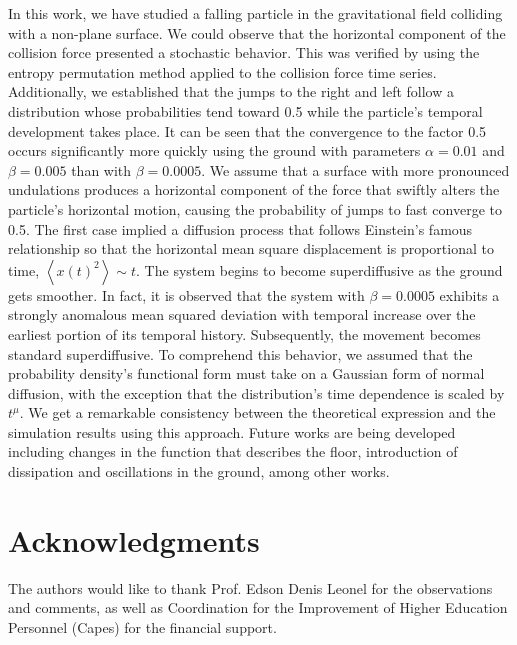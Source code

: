 \documentclass[reprint, aps, pre,nofootinbib]{revtex4-1}
\begin{document}
In this work, we have studied a falling particle in the gravitational
field colliding with a non-plane surface. We could observe that the
horizontal component of the collision force presented a stochastic
behavior. This was verified by using the entropy permutation method
applied to the collision force time series. Additionally, we established
that the jumps to the right and left follow a distribution whose probabilities
tend toward 0.5 while the particle's temporal development takes place.
It can be seen that the convergence to the factor 0.5 occurs significantly
more quickly using the ground with parameters $\alpha=0.01$ and $\beta=0.005$
than with $\beta=0.0005$. We assume that a surface with more pronounced
undulations produces a horizontal component of the force that swiftly
alters the particle's horizontal motion, causing the probability of
jumps to fast converge to 0.5. The first case implied a diffusion
process that follows Einstein's famous relationship so that the horizontal
mean square displacement is proportional to time, $\left\langle x(t)^{2}\right\rangle \sim t$.
The system begins to become superdiffusive as the ground gets smoother.
In fact, it is observed that the system with $\beta=0.0005$ exhibits
a strongly anomalous mean squared deviation with temporal increase
over the earliest portion of its temporal history. Subsequently, the
movement becomes \textquotedbl standard superdiffusive\textquotedbl .
To comprehend this behavior, we assumed that the probability density's
functional form must take on a Gaussian form of normal diffusion,
with the exception that the distribution's time dependence is scaled
by $t^{\mu}$. We get a remarkable consistency between the theoretical
expression and the simulation results using this approach. Future
works are being developed including changes in the function that describes
the floor, introduction of dissipation and oscillations in the ground,
among other works.

\section*{Acknowledgments}

The authors would like to thank Prof. Edson Denis Leonel for the observations
and comments, as well as Coordination for the Improvement of Higher
Education Personnel (Capes) for the financial support.

\section*{\textemdash \textemdash \textemdash \textemdash \textemdash \textendash{}}


\end{document}
